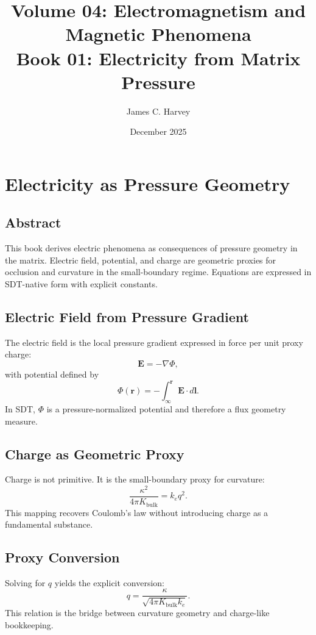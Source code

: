 \documentclass[12pt]{book}
\title{Volume 04: Electromagnetism and Magnetic Phenomena \\ Book 01: Electricity from Matrix Pressure}
\author{James C. Harvey}
\date{December 2025}
\begin{document}
\maketitle
\tableofcontents

\chapter{Electricity as Pressure Geometry}

\section*{Abstract}
This book derives electric phenomena as consequences of pressure geometry in the matrix. Electric field,
potential, and charge are geometric proxies for occlusion and curvature in the small-boundary regime.
Equations are expressed in SDT-native form with explicit constants.

\section{Electric Field from Pressure Gradient}
The electric field is the local pressure gradient expressed in force per unit proxy charge:
\begin{equation}
\mathbf{E} = -\nabla \Phi,
\end{equation}
with potential defined by
\begin{equation}
\Phi(\mathbf{r}) = -\int_{\infty}^{\mathbf{r}} \mathbf{E}\cdot d\mathbf{l}.
\end{equation}
In SDT, $\Phi$ is a pressure-normalized potential and therefore a flux geometry measure.

\section{Charge as Geometric Proxy}
Charge is not primitive. It is the small-boundary proxy for curvature:
\begin{equation}
\frac{\kappa^2}{4\pi K_{\text{bulk}}} = k_e q^2.
\end{equation}
This mapping recovers Coulomb’s law without introducing charge as a fundamental substance.

\section{Proxy Conversion}
Solving for $q$ yields the explicit conversion:
\begin{equation}
q = \frac{\kappa}{\sqrt{4\pi K_{\text{bulk}} k_e}}.
\end{equation}
This relation is the bridge between curvature geometry and charge-like bookkeeping.
\end{document}

